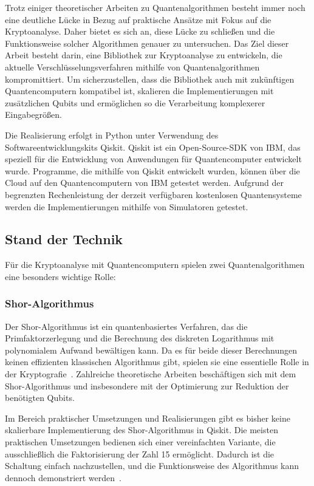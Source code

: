 \documentclass[
  a4paper, %
  10pt, %
  unnumberedsections, %
  twoside, %
]{LTJournalArticle}
\begin{document}
Trotz einiger theoretischer Arbeiten zu Quantenalgorithmen
besteht immer noch eine deutliche Lücke in Bezug auf praktische Ansätze mit Fokus auf die Kryptoanalyse.
Daher bietet es sich an, diese Lücke zu schließen und die Funktionsweise solcher Algorithmen genauer zu untersuchen.
Das Ziel dieser Arbeit besteht darin, eine Bibliothek zur Kryptoanalyse zu entwickeln,
die aktuelle Verschlüsselungsverfahren mithilfe von Quantenalgorithmen kompromittiert.
Um sicherzustellen, dass die Bibliothek auch mit zukünftigen Quantencomputern kompatibel ist,
skalieren die Implementierungen mit zusätzlichen Qubits und
ermöglichen so die Verarbeitung komplexerer Eingabegrößen.

Die Realisierung erfolgt in Python unter Verwendung des Softwareentwicklungskits Qiskit.
Qiskit ist ein Open-Source-SDK von IBM,
das speziell für die Entwicklung von Anwendungen für Quantencomputer entwickelt wurde.
Programme, die mithilfe von Qiskit entwickelt wurden,
können über die Cloud auf den Quantencomputern von IBM getestet werden.
Aufgrund der begrenzten Rechenleistung der derzeit verfügbaren kostenlosen Quantensysteme
werden die Implementierungen mithilfe von Simulatoren getestet.



\subsection{Stand der Technik}

Für die Kryptoanalyse mit Quantencomputern spielen zwei Quantenalgorithmen eine besonders wichtige Rolle:

\subsubsection{Shor-Algorithmus}
Der Shor-Algorithmus ist ein quantenbasiertes Verfahren,
das die Primfaktorzerlegung und die Berechnung des diskreten Logarithmus
mit polynomialem Aufwand bewältigen kann.
Da es für beide dieser Berechnungen keinen effizienten klassischen Algorithmus gibt,
spielen sie eine essentielle Rolle in der Kryptografie~\autocite{Shor:1997}.
Zahlreiche theoretische Arbeiten beschäftigen sich mit dem Shor-Algorithmus und
insbesondere mit der Optimierung zur Reduktion der benötigten Qubits.

Im Bereich praktischer Umsetzungen und Realisierungen
gibt es bisher keine skalierbare Implementierung des Shor-Algorithmus in Qiskit.
Die meisten praktischen Umsetzungen bedienen sich einer vereinfachten Variante,
die ausschließlich die Faktorisierung der Zahl 15 ermöglicht.
Dadurch ist die Schaltung einfach nachzustellen,
und die Funktionsweise des Algorithmus kann dennoch demonstriert werden~\autocite{9376169, Monz_2016, IBM:Shor}.
\end{document}
